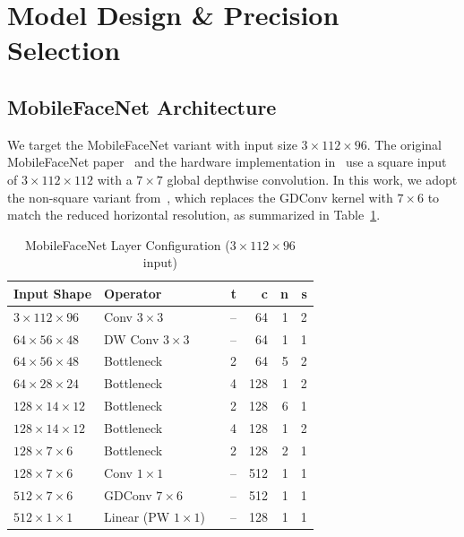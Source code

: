 \section{Model Design \& Precision Selection}
 
\subsection{MobileFaceNet Architecture}

We target the MobileFaceNet variant with input size $3 \times 112 \times 96$.
The original MobileFaceNet paper~\cite{chen2018mobilefacenetsefficientcnnsaccurate}
and the hardware implementation in~\cite{7738524} use a square input of
$3 \times 112 \times 112$ with a $7\times7$ global depthwise convolution.
In this work, we adopt the non-square variant from~\cite{Linjun_SUN20202019EDL8103},
which replaces the GDConv kernel with $7\times6$ to match the reduced horizontal
resolution, as summarized in Table~\ref{tab:mobile}.

\begin{table}[H]
\centering
\caption{MobileFaceNet Layer Configuration ($3\times112\times96$ input)}
\label{tab:mobile}
\begin{tabular}{lllrrrr}
\toprule
\textbf{Input Shape} & \textbf{Operator} & & \textbf{t} & \textbf{c} & \textbf{n} & \textbf{s} \\
\midrule
$3\times112\times96$   & Conv $3\times3$        & & --  & 64  & 1 & 2 \\
$64\times56\times48$   & DW Conv $3\times3$     & & --  & 64  & 1 & 1 \\
$64\times56\times48$   & Bottleneck             & & 2   & 64  & 5 & 2 \\
$64\times28\times24$   & Bottleneck             & & 4   & 128 & 1 & 2 \\
$128\times14\times12$  & Bottleneck             & & 2   & 128 & 6 & 1 \\
$128\times14\times12$  & Bottleneck             & & 4   & 128 & 1 & 2 \\
$128\times7\times6$    & Bottleneck             & & 2   & 128 & 2 & 1 \\
$128\times7\times6$    & Conv $1\times1$        & & --  & 512 & 1 & 1 \\
$512\times7\times6$    & GDConv $7\times6$      & & --  & 512 & 1 & 1 \\
$512\times1\times1$    & Linear (PW $1\times1$) & & --  & 128 & 1 & 1 \\
\bottomrule
\end{tabular}
\end{table}

